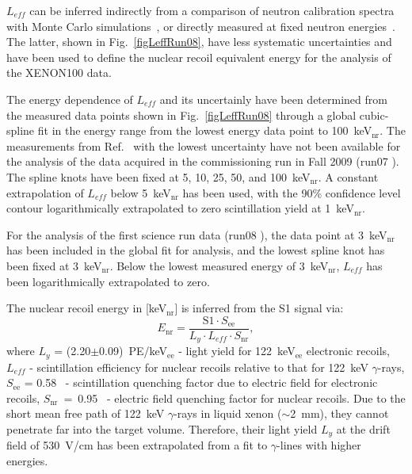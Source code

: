 $L_{eff}$ can be inferred indirectly from a comparison of neutron calibration spectra with Monte Carlo simulations~\cite{LeffSorensen, LeffZeplin, LeffZeplinHorn}, or directly measured at fixed neutron energies~\cite{LeffArneodo, LeffBernabei,  LeffAprile2005, LeffChepel, LeffAprile2009, LeffManzur, LeffPlante}. The latter, shown in Fig.~\ref{figLeffRun08}, have less systematic uncertainties and have been used to define the nuclear recoil equivalent energy for the analysis of the XENON100 data.

The energy dependence of $L_{eff}$ and its uncertainly have been determined from the measured data points shown in Fig.~\ref{figLeffRun08} through a global cubic-spline fit in the energy range from the lowest energy data point to 100~keV$_{\mathrm{nr}}$. The measurements from Ref.~\cite{LeffPlante} with the lowest uncertainty have not been available for the analysis of the data acquired in the commissioning run in Fall 2009 (run07 \cite{xe100-run07}). The spline knots have been fixed at 5, 10, 25, 50, and 100~keV$_{\mathrm{nr}}$. A constant extrapolation of $L_{eff}$ below 5~keV$_{\mathrm{nr}}$ has been used, with the 90\% confidence level contour logarithmically extrapolated to zero scintillation yield at 1~keV$_{\mathrm{nr}}$.

For the analysis of the first science run data (run08 \cite{xe100-run08}), the data point at 3~keV$_{\mathrm{nr}}$ has been included in the global fit for analysis, and the lowest spline knot has been fixed at 3~keV$_{\mathrm{nr}}$. 
Below the lowest measured energy of 3~keV$_{\mathrm{nr}}$, $L_{eff}$ has been logarithmically extrapolated to zero.

The nuclear recoil energy in [keV$_{\mathrm{nr}}$] is inferred from the S1 signal via:
\begin{equation}
E_{\mathrm{nr}} = \frac{ \mathrm{S}1 \cdot S_{\mathrm{ee}} }{ L_{y} \cdot L_{eff} \cdot S_{\mathrm{nr}} },
\end{equation}
where $L_{y}$ = (2.20$\pm$0.09)~PE/keV$_{\mathrm{ee}}$ - light yield for 122~keV$_{\mathrm{ee}}$ electronic recoils, $L_{eff}$ - scintillation efficiency for nuclear recoils relative to that for 122~keV $\gamma$-rays, $S_{\mathrm{ee}}$ = 0.58~\cite{FieldQuenchingFactorsAprile} - scintillation quenching factor due to electric field for electronic recoils, $S_{\mathrm{nr}}$~=~0.95~\cite{FieldQuenchingFactorsAprile} - electric field quenching factor for nuclear recoils. 
Due to the short mean free path of 122~keV $\gamma$-rays in liquid xenon ($\sim$2~mm), they cannot penetrate far into the target volume. Therefore, their light yield $L_{y}$ at the drift field of 530~V/cm has been extrapolated from a fit to $\gamma$-lines with higher energies. 








